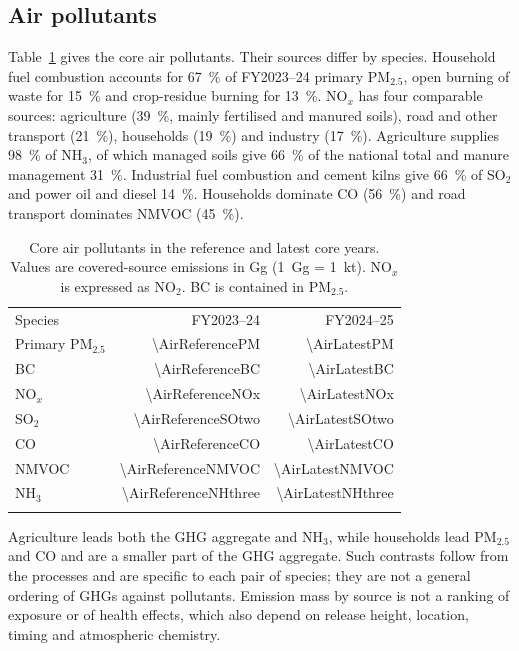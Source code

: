 \documentclass[essd,manuscript]{copernicus}
\begin{document}
\subsection{Air pollutants}
Table~\ref{tab:air_results} gives the core air pollutants. Their sources differ by species. Household fuel combustion accounts for \SI{67}{\percent} of FY2023--24 primary PM$_{2.5}$, open burning of waste for \SI{15}{\percent} and crop-residue burning for \SI{13}{\percent}. NO$_x$ has four comparable sources: agriculture (\SI{39}{\percent}, mainly fertilised and manured soils), road and other transport (\SI{21}{\percent}), households (\SI{19}{\percent}) and industry (\SI{17}{\percent}). Agriculture supplies \SI{98}{\percent} of NH$_3$, of which managed soils give \SI{66}{\percent} of the national total and manure management \SI{31}{\percent}. Industrial fuel combustion and cement kilns give \SI{66}{\percent} of SO$_2$ and power oil and diesel \SI{14}{\percent}. Households dominate CO (\SI{56}{\percent}) and road transport dominates NMVOC (\SI{45}{\percent}).

\begin{table}[t]
\caption{Core air pollutants in the reference and latest core years. Values are covered-source emissions in Gg (1~Gg = 1~kt). NO$_x$ is expressed as NO$_2$. BC is contained in PM$_{2.5}$.}
\label{tab:air_results}
\begin{tabular}{lrr}
\tophline
Species & FY2023--24 & FY2024--25 \\
\middlehline
Primary PM$_{2.5}$ & \num{\AirReferencePM} & \num{\AirLatestPM} \\
BC & \num{\AirReferenceBC} & \num{\AirLatestBC} \\
NO$_x$ & \num{\AirReferenceNOx} & \num{\AirLatestNOx} \\
SO$_2$ & \num{\AirReferenceSOtwo} & \num{\AirLatestSOtwo} \\
CO & \num{\AirReferenceCO} & \num{\AirLatestCO} \\
NMVOC & \num{\AirReferenceNMVOC} & \num{\AirLatestNMVOC} \\
NH$_3$ & \num{\AirReferenceNHthree} & \num{\AirLatestNHthree} \\
\bottomhline
\end{tabular}
\end{table}

Agriculture leads both the GHG aggregate and NH$_3$, while households lead PM$_{2.5}$ and CO and are a smaller part of the GHG aggregate. Such contrasts follow from the processes and are specific to each pair of species; they are not a general ordering of GHGs against pollutants. Emission mass by source is not a ranking of exposure or of health effects, which also depend on release height, location, timing and atmospheric chemistry.
\end{document}
